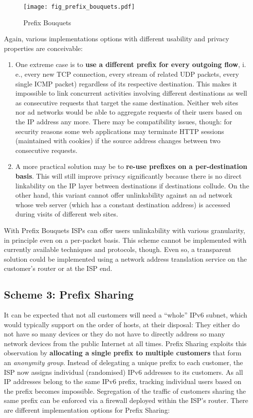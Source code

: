 \documentclass{easychair}
\begin{document}
\begin{figure}[htbp]
        \centering
                \texttt{[image: fig\_prefix\_bouquets.pdf]}
        \caption{Prefix Bouquets}
        \label{fig:fig_prefix_bouquets}
\end{figure}

Again, various implementations options with different usability and privacy properties are conceivable:

\begin{enumerate}
	\item One extreme case is to \textbf{use a different prefix for every outgoing flow}, i.\,e., every new TCP connection, every stream of related UDP packets, every single ICMP packet) regardless of its respective destination. This makes it impossible to link concurrent activities involving different destinations as well as consecutive requests that target the same destination. Neither web sites nor ad networks would be able to aggregate requests of their users based on the IP address any more. There may be compatibility issues, though: for security reasons some web applications may terminate HTTP sessions (maintained with cookies) if the source address changes between two consecutive requests.
	\item A more practical solution may be to \textbf{re-use prefixes on a per-destination basis}. This will still improve privacy significantly because there is no direct linkability on the IP layer between destinations if destinations collude. On the other hand, this variant cannot offer unlinkability against an ad network whose web server (which has a constant destination address) is accessed during visits of different web sites.
\end{enumerate}

With Prefix Bouquets ISPs can offer users unlinkability with various granularity, in principle even on a per-packet basis. This scheme cannot be implemented with currently available techniques and protocols, though. Even so, a transparent solution could be implemented using a network address translation service on the customer's router or at the ISP end.

\subsection{Scheme 3: Prefix Sharing}

It can be expected that not all customers will need a ``whole'' IPv6 subnet, which would typically support on the order of  hosts, at their disposal: They either do not have so many devices or they do not have to directly address so many network devices from the public Internet at all times. Prefix Sharing exploits this observation by \textbf{allocating a single prefix to multiple customers} that form an \emph{anonymity group}. Instead of delegating a unique prefix to each customer, the ISP now assigns individual (randomised) IPv6 addresses to its customers. As all IP addresses belong to the same IPv6 prefix, tracking individual users based on the prefix becomes impossible. Segregation of the  traffic of customers sharing the same prefix can be enforced via a firewall deployed within the ISP's router. There are different implementation options for Prefix Sharing:
\end{document}
